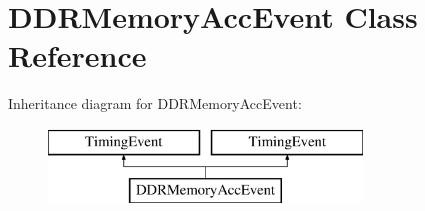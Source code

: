\hypertarget{classDDRMemoryAccEvent}{\section{D\-D\-R\-Memory\-Acc\-Event Class Reference}
\label{classDDRMemoryAccEvent}
}
Inheritance diagram for D\-D\-R\-Memory\-Acc\-Event\-:\begin{figure}[H]
\begin{center}
\leavevmode
\includegraphics[height=2.000000cm]{classDDRMemoryAccEvent}
\end{center}
\end{figure}
